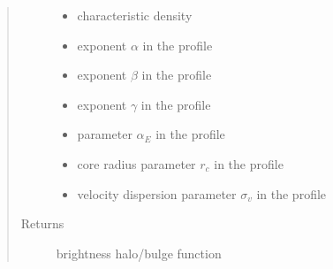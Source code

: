 \documentclass[letterpaper,10pt,english]{sphinxmanual}
\begin{document}
\begin{fulllineitems}
\begin{quote}
\begin{description}
\begin{itemize}
\item {} 
\sphinxAtStartPar
{} \textendash{} characteristic density

\item {} 
\sphinxAtStartPar
{} \textendash{} exponent \(\alpha\) in the {\hyperref[\detokenize{diffsph.profiles:diffsph.profiles.templates.hdz}]{}} profile

\item {} 
\sphinxAtStartPar
{} \textendash{} exponent \(\beta\) in the {\hyperref[\detokenize{diffsph.profiles:diffsph.profiles.templates.hdz}]{}} profile

\item {} 
\sphinxAtStartPar
{} \textendash{} exponent \(\gamma\) in the {\hyperref[\detokenize{diffsph.profiles:diffsph.profiles.templates.hdz}]{}} profile

\item {} 
\sphinxAtStartPar
{} \textendash{} parameter \(\alpha_E\) in the {\hyperref[\detokenize{diffsph.profiles:diffsph.profiles.templates.enst}]{}} profile

\item {} 
\sphinxAtStartPar
{} \textendash{} core radius parameter \(r_c\) in the {\hyperref[\detokenize{diffsph.profiles:diffsph.profiles.templates.cnfw}]{}} profile

\item {} 
\sphinxAtStartPar
{} \textendash{} velocity dispersion parameter \(\sigma_v\) in the {\hyperref[\detokenize{diffsph.profiles:diffsph.profiles.templates.sis}]{}} profile

\end{itemize}

\item[{Returns}] \leavevmode
\sphinxAtStartPar
brightness halo/bulge function

\end{description}\end{quote}

\end{fulllineitems}
\end{document}

